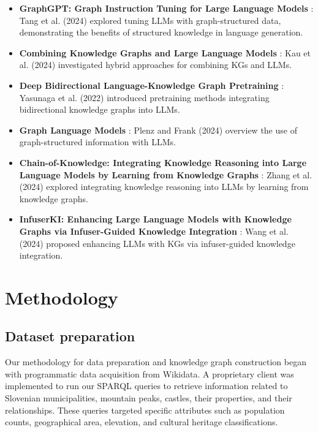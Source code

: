 \documentclass[fleqn,moreauthors,10pt]{ds_report}
\begin{document}
\begin{itemize}[noitemsep]
    \item \textbf{GraphGPT: Graph Instruction Tuning for Large Language Models} \cite{Tang2024GraphGPT}: Tang et al. (2024) explored tuning LLMs with graph-structured data, demonstrating the benefits of structured knowledge in language generation.
    \item \textbf{Combining Knowledge Graphs and Large Language Models} \cite{Kau2024CombiningKGLLM}: Kau et al. (2024) investigated hybrid approaches for combining KGs and LLMs.
    \item \textbf{Deep Bidirectional Language-Knowledge Graph Pretraining} \cite{Yasunaga2022DBLP}: Yasunaga et al. (2022) introduced pretraining methods integrating bidirectional knowledge graphs into LLMs.
    \item \textbf{Graph Language Models} \cite{Plenz2024GLM}: Plenz and Frank (2024) overview the use of graph-structured information with LLMs.
    \item \textbf{Chain-of-Knowledge: Integrating Knowledge Reasoning into Large Language Models by Learning from Knowledge Graphs} \cite{Zhang2024CoK}: Zhang et al. (2024) explored integrating knowledge reasoning into LLMs by learning from knowledge graphs.
    \item \textbf{InfuserKI: Enhancing Large Language Models with Knowledge Graphs via Infuser-Guided Knowledge Integration} \cite{Wang2024InfuserKI}: Wang et al. (2024) proposed enhancing LLMs with KGs via infuser-guided knowledge integration.
\end{itemize}

\section*{Methodology}

\subsection*{Dataset preparation}

Our methodology for data preparation and knowledge graph construction began with programmatic data acquisition from Wikidata. A proprietary client was implemented to run our SPARQL queries to retrieve information related to Slovenian municipalities, mountain peaks, castles, their properties, and their relationships. These queries targeted specific attributes such as population counts, geographical area, elevation, and cultural heritage classifications.
\end{document}
